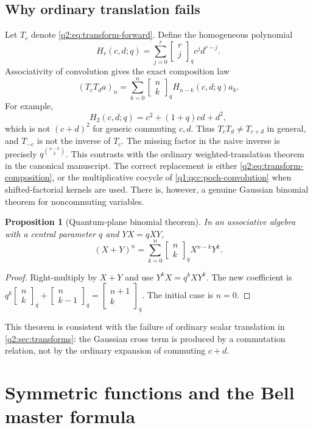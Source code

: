 \documentclass[11pt,a4paper,oneside,openany]{book}
\newtheorem{proposition}[theorem]{Proposition}
\theoremstyle{definition}
\theoremstyle{remark}
\newcommand{\GB}[3][q]{\begin{bmatrix}#2\\#3\end{bmatrix}_{#1}}
\newcommand{\qb}[2]{\GB{#1}{#2}}
\begin{document}
\section{Why ordinary translation fails}
Let $T_c$ denote \eqref{q2:eq:transform-forward}. Define the homogeneous polynomial
\[
 H_r(c,d;q)=\sum_{j=0}^r\qb rj c^j d^{r-j}.
\]
Associativity of convolution gives the exact composition law
\begin{equation}\label{q2:eq:transform-composition}
 (T_cT_d a)_n=\sum_{k=0}^n\qb nk H_{n-k}(c,d;q)a_k.
\end{equation}
For example,
\[
 H_2(c,d;q)=c^2+(1+q)cd+d^2,
\]
which is not $(c+d)^2$ for generic commuting $c,d$. Thus
$T_cT_d\ne T_{c+d}$ in general, and $T_{-c}$ is not the inverse of $T_c$.
The missing factor in the naive inverse is precisely $q^{\binom{n-k}2}$.
This contrasts with the ordinary weighted-translation theorem in the canonical manuscript.
The correct replacement is either \eqref{q2:eq:transform-composition}, or the
multiplicative cocycle of \cref{q1:qcc:poch-convolution} when shifted-factorial kernels are used.
There is, however, a genuine Gaussian binomial theorem for noncommuting variables.
\begin{proposition}[Quantum-plane binomial theorem]\label{q2:prop:quantum-plane}
In an associative algebra with a central parameter $q$ and $YX=qXY$,
\begin{equation}\label{q2:eq:quantum-plane}
 (X+Y)^n=\sum_{k=0}^n\qb nk X^{n-k}Y^k.
\end{equation}
\end{proposition}
\begin{proof}
Right-multiply by $X+Y$ and use $Y^kX=q^kXY^k$.
The new coefficient is $q^k\qb nk+\qb n{k-1}=\qb{n+1}k$.
The initial case is $n=0$.
\end{proof}
This theorem is consistent with the failure of ordinary scalar translation in
\cref{q2:sec:transforms}: the Gaussian cross term is produced by a commutation
relation, not by the ordinary expansion of commuting $c+d$.
\chapter{Symmetric functions and the Bell master formula}
\label{q1:qcc:bell-master}
\end{document}
